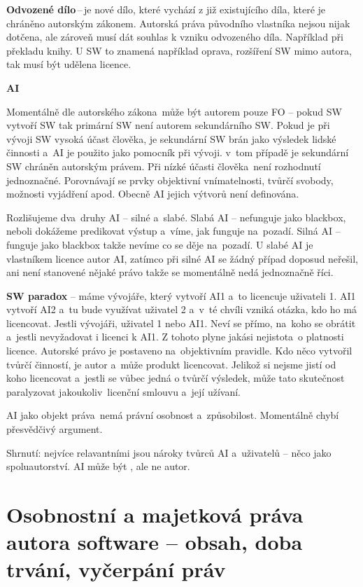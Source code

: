 \textbf{Odvozené dílo}\,--\,je nové dílo, které vychází z již existujícího díla, které je chráněno autorským zákonem. Autorská práva původního vlastníka nejsou nijak dotčena, ale zároveň musí dát souhlas k vzniku odvozeného díla. Například při překladu knihy. U SW to znamená například oprava, rozšíření SW mimo autora, tak musí být udělena licence. 

\vspace{1cm}
\noindent\textbf{AI}

\noindent Momentálně dle autorského zákona~může být autorem pouze FO -- pokud SW vytvoří SW tak primární SW není autorem sekundárního SW. Pokud je při vývoji SW vysoká účast člověka, je sekundární SW brán jako výsledek lidské činnosti a~AI je použito jako pomocník při vývoji. v~tom případě je sekundární SW chráněn autorským právem. Při nízké účasti člověka~není rozhodnutí jednoznačné. Porovnávají se prvky objektivní vnímatelnosti, tvůrčí svobody, možnosti vyjádření apod. Obecně AI jejich výtvorů není definována. 

Rozlišujeme dva~druhy AI -- silné a~slabé. Slabá AI -- nefunguje jako blackbox, neboli dokážeme predikovat výstup a~víme, jak funguje na~pozadí. Silná AI -- funguje jako blackbox takže nevíme co se děje na~pozadí. U slabé AI je vlastníkem licence autor AI, zatímco při silné AI se žádný případ doposud neřešil, ani není stanovené nějaké právo takže se momentálně nedá jednoznačně říci.

\textbf{SW paradox} -- máme vývojáře, který vytvoří AI1 a~to licencuje uživateli 1. AI1 vytvoří AI2 a~tu bude využívat uživatel 2 a~v~té chvíli vzniká otázka, kdo ho má licencovat. Jestli vývojáři, uživatel 1 nebo AI1. Neví se přímo, na~koho se obrátit a~jestli nevyžadovat i licenci k AI1. Z tohoto plyne jakási nejistota~o platnosti licence. Autorské právo je postaveno na~objektivním pravidle. Kdo něco vytvořil tvůrčí činností, je autor a~může produkt licencovat. Jelikož si nejsme jistí od koho licencovat a~jestli se vůbec jedná o tvůrčí výsledek, může tato skutečnost paralyzovat jakoukoliv~licenční smlouvu a~její užívaní.

AI jako objekt práva~nemá právní osobnost a~způsobilost. Momentálně chybí přesvědčivý argument. 

Shrnutí: nejvíce relavantními jsou nároky tvůrců AI a~uživatelů -- něco jako spoluautorství. AI může být , ale ne autor.

\newpage
\section{Osobnostní a majetková práva autora software -- obsah, doba trvání, vyčerpání práv}

